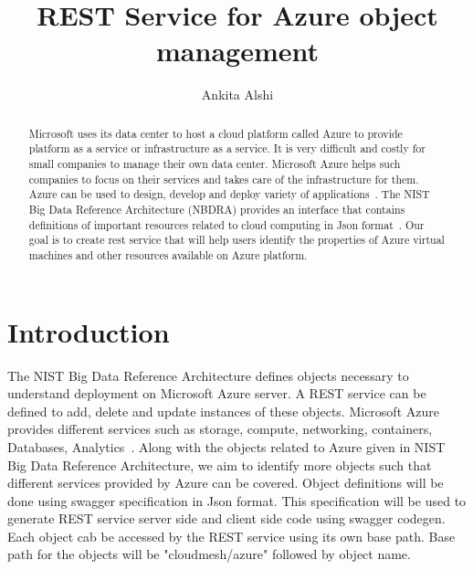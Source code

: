 
\title{REST Service for Azure object management}


\author{Ankita Alshi}


\renewcommand{\shortauthors}{Ankita Alshi}


\begin{abstract}
Microsoft uses its data center to host a cloud platform called Azure to
provide platform as a service or infrastructure as a service. It is very
difficult and costly for small companies to manage their own data center.
Microsoft Azure helps such companies to focus on their services and takes care
of the infrastructure for them. Azure can be used to design, develop and deploy
variety of applications~\cite{hid-sp18-502-microsoft-azure}. The NIST Big Data
 Reference Architecture (NBDRA) provides an interface that contains definitions
 of important resources related to cloud computing in Json
 format~\cite{hid-sp18-502-nist-vol8}. Our goal is to create rest service that
 will help users identify the properties of Azure virtual machines and other
 resources available on Azure platform.

\end{abstract}



\maketitle

\section{Introduction}
The NIST Big Data Reference Architecture defines objects necessary to
understand deployment on Microsoft Azure server. A REST service can be defined
to add, delete and update instances of these objects. Microsoft Azure
provides different services such as storage, compute, networking,
containers, Databases, Analytics~\cite{hid-sp18-502-microsoft-azure}. Along with
 the objects related to Azure given in NIST Big Data Reference Architecture, we
 aim to identify more objects such that different services provided by Azure can
 be covered. Object definitions will be done using swagger specification in
 Json format. This specification will be used to generate REST service server
 side and client side code using swagger codegen. Each object cab be accessed
 by the REST service using its own base path. Base path for the objects will be
 "cloudmesh/azure" followed by object name.


